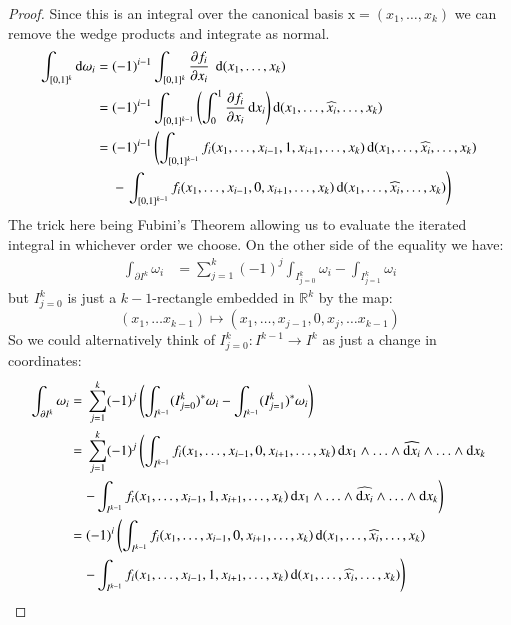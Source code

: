 \begin{proof}
Since this is an integral over the canonical basis $\text{x} = (x_1, \ldots, x_k)$ we can remove the wedge products and
integrate as normal.
\begin{align*}
	\int_{[0,1]^k} \mathop{}\!\mathrm{d} \omega_i
		=&\; (-1)^{i-1} \int_{[0,1]^k} \frac{\partial f_i}{\partial x_i}\; \mathop{}\!\mathrm{d}(x_1, \ldots, x_k) \\
		=&\; (-1)^{i-1} \int_{[0,1]^{k-1}} \left( \int_0^1 \frac{\partial f_i}{\partial x_i} \mathop{}\!\mathrm{d} x_i \right) 
			\mathop{}\!\mathrm{d}(x_1, \ldots, \widehat{x_i}, \ldots, x_k)\\
		=&\; (-1)^{i-1}\left( \int_{[0,1]^{k-1}} f_i(x_1, \ldots, x_{i-1}, 1, x_{i+1}, \ldots, x_k)
			\mathop{}\!\mathrm{d}(x_1, \ldots, \widehat{x_i}, \ldots, x_k) \right.\\
		&\;	- \left. \int_{[0,1]^{k-1}} f_i(x_1, \ldots, x_{i-1}, 0, x_{i+1}, \ldots, x_k)
			\mathop{}\!\mathrm{d}(x_1, \ldots, \widehat{x_i}, \ldots, x_k) \right)
\end{align*}
The trick here being Fubini's Theorem allowing us to evaluate the iterated integral in whichever order we choose.
On the other side of the equality we have:
\begin{align*}
	\int_{\partial I^k} \omega_i
		&= \sum_{j=1}^k (-1)^j \int_{I^k_{j=0}} \omega_i - \int_{I^k_{j=1}} \omega_i
\end{align*}
but $I^k_{j=0}$ is just a $k-1$-rectangle embedded in $\mathbb{R}^k$ by the map:
\begin{equation*}
	(x_1, \ldots x_{k-1}) \mapsto (x_1, \ldots, x_{j-1}, 0, x_{j}, \ldots x_{k-1})
\end{equation*}
So we could alternatively think of $I^k_{j=0}: I^{k-1} \to I^k$ as just a change in coordinates:
\begin{align*}
	\int_{\partial I^k} \omega_i 
		=&\; \sum_{j=1}^k (-1)^j 
			\left(\int_{I^{k-1}} (I^k_{j=0})^*\omega_i - \int_{I^{k-1}} (I^k_{j=1})^* \omega_i \right) \\
		=&\; \sum_{j=1}^k (-1)^j 
			\left(\int_{I^{k-1}} f_i (x_1, \ldots, x_{i-1}, 0, x_{i+1}, \ldots, x_k)
				\diff x_1 \wedge \ldots \wedge \widehat{\diff x_i} \wedge  \ldots \wedge \diff x_k \right. \\
		&	\left. - \int_{I^{k-1}} f_i (x_1, \ldots, x_{i-1}, 1, x_{i+1}, \ldots, x_k)
				\diff x_1 \wedge \ldots \wedge \widehat{\diff x_i} \wedge  \ldots \wedge \diff x_k \right)\\
		=&\; (-1)^i \left(\int_{I^{k-1}} f_i (x_1, \ldots, x_{i-1}, 0, x_{i+1}, \ldots, x_k)
				\diff (x_1, \ldots,\widehat{x_i},  \ldots, x_k) \right. \\
		&	\left. - \int_{I^{k-1}} f_i (x_1, \ldots, x_{i-1}, 1, x_{i+1}, \ldots, x_k)
				\diff (x_1, \ldots,\widehat{x_i},  \ldots, x_k) \right)
\end{align*}




\end{proof}

